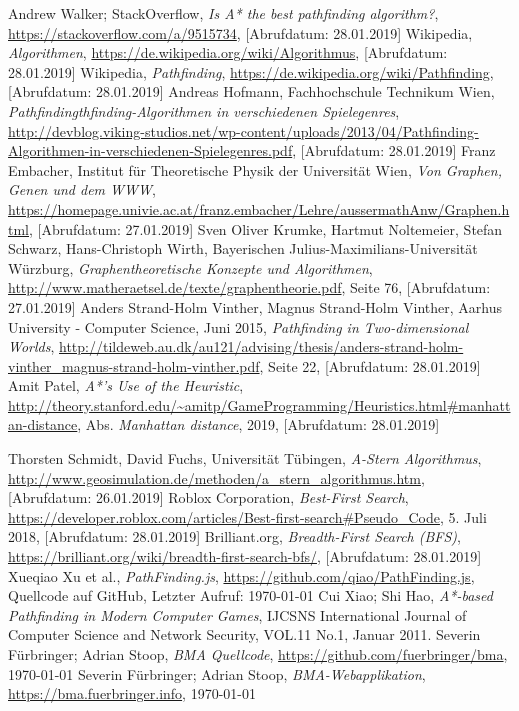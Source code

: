 \begin{thebibliography}{9}
  Andrew Walker; StackOverflow,
  \textit{Is A* the best pathfinding algorithm?},
  \url{https://stackoverflow.com/a/9515734},
  [Abrufdatum: 28.01.2019]
  Wikipedia,
  \textit{Algorithmen},
  \url{https://de.wikipedia.org/wiki/Algorithmus},
  [Abrufdatum: 28.01.2019]
  Wikipedia,
  \textit{Pathfinding},
  \url{https://de.wikipedia.org/wiki/Pathfinding},
  [Abrufdatum: 28.01.2019]
  Andreas Hofmann, Fachhochschule Technikum Wien,
  \textit{Pathfindingthfinding-Algorithmen in verschiedenen Spielegenres},
  \url{http://devblog.viking-studios.net/wp-content/uploads/2013/04/Pathfinding-Algorithmen-in-verschiedenen-Spielegenres.pdf},
  [Abrufdatum: 28.01.2019]
  Franz Embacher, Institut für Theoretische Physik der Universität Wien,
  \textit{Von Graphen, Genen und dem WWW},
  \url{https://homepage.univie.ac.at/franz.embacher/Lehre/aussermathAnw/Graphen.html},
  [Abrufdatum: 27.01.2019]
  Sven Oliver Krumke, Hartmut Noltemeier, Stefan Schwarz, Hans-Christoph Wirth,
  Bayerischen Julius-Maximilians-Universität Würzburg,
  \textit{Graphentheoretische Konzepte und Algorithmen},
  \url{http://www.matheraetsel.de/texte/graphentheorie.pdf},
  Seite 76,
  [Abrufdatum: 27.01.2019]
  Anders Strand-Holm Vinther, Magnus Strand-Holm Vinther, Aarhus University - Computer Science, Juni 2015,
  \textit{Pathfinding in Two-dimensional Worlds},
  \url{http://tildeweb.au.dk/au121/advising/thesis/anders-strand-holm-vinther\_magnus-strand-holm-vinther.pdf},
  Seite 22,
  [Abrufdatum: 28.01.2019]
  Amit Patel,
  \textit{A*'s Use of the Heuristic},
  \url{http://theory.stanford.edu/~amitp/GameProgramming/Heuristics.html\#manhattan-distance},
  Abs. \textit{Manhattan distance},
  2019, 
  [Abrufdatum: 28.01.2019]

  Thorsten Schmidt, David Fuchs, Universität Tübingen,
  \textit{A-Stern Algorithmus},
  \url{http://www.geosimulation.de/methoden/a\_stern\_algorithmus.htm},
  [Abrufdatum: 26.01.2019]
  Roblox Corporation, 
  \textit{Best-First Search},
  \url{https://developer.roblox.com/articles/Best-first-search\#Pseudo\_Code},
  5. Juli 2018,
  [Abrufdatum: 28.01.2019]
  Brilliant.org,
  \textit{Breadth-First Search (BFS)},
  \url{https://brilliant.org/wiki/breadth-first-search-bfs/},
  [Abrufdatum: 28.01.2019]
  Xueqiao Xu et al.,
  \textit{PathFinding.js},
  \url{https://github.com/qiao/PathFinding.js},
  Quellcode auf GitHub,
  Letzter Aufruf: \today
{}
  Cui Xiao; Shi Hao,
  \textit{A*-based Pathfinding in Modern Computer Games},
  IJCSNS International Journal of Computer Science and Network Security, VOL.11 No.1,
  Januar 2011.
  Severin Fürbringer; Adrian Stoop,
  \textit{BMA Quellcode},
  \url{https://github.com/fuerbringer/bma},
  \today
{}
  Severin Fürbringer; Adrian Stoop,
  \textit{BMA-Webapplikation},
  \url{https://bma.fuerbringer.info},
  \today
\end{thebibliography}
